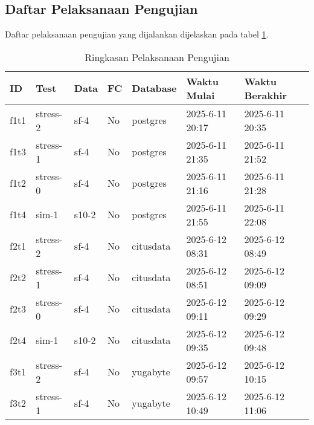 \subsection{Daftar Pelaksanaan Pengujian}

Daftar pelaksanaan pengujian yang dijalankan dijelaskan pada tabel \ref{tab:execution-summary}.

\begin{table}[htbp]
    \centering
    \caption{Ringkasan Pelaksanaan Pengujian}
    \label{tab:execution-summary}
    \begin{tabular}{|l|l|l|l|l|l|l|}
        \hline
        \textbf{ID} & \textbf{Test} & \textbf{Data} & \textbf{FC} & \textbf{Database} & \textbf{Waktu Mulai} & \textbf{Waktu Berakhir} \\ \hline
        f1t1        & stress-2      & sf-4          & No          & postgres          & 2025-6-11 20:17     & 2025-6-11 20:35        \\ \hline
        f1t3        & stress-1      & sf-4          & No          & postgres          & 2025-6-11 21:35     & 2025-6-11 21:52        \\ \hline
        f1t2        & stress-0      & sf-4          & No          & postgres          & 2025-6-11 21:16     & 2025-6-11 21:28        \\ \hline
        f1t4        & sim-1         & s10-2         & No          & postgres          & 2025-6-11 21:55     & 2025-6-11 22:08        \\ \hline
        f2t1        & stress-2      & sf-4          & No          & citusdata         & 2025-6-12 08:31     & 2025-6-12 08:49        \\ \hline
        f2t2        & stress-1      & sf-4          & No          & citusdata         & 2025-6-12 08:51     & 2025-6-12 09:09        \\ \hline
        f2t3        & stress-0      & sf-4          & No          & citusdata         & 2025-6-12 09:11     & 2025-6-12 09:29        \\ \hline
        f2t4        & sim-1         & s10-2         & No          & citusdata         & 2025-6-12 09:35     & 2025-6-12 09:48        \\ \hline
        f3t1        & stress-2      & sf-4          & No          & yugabyte          & 2025-6-12 09:57     & 2025-6-12 10:15        \\ \hline
        f3t2        & stress-1      & sf-4          & No          & yugabyte          & 2025-6-12 10:49     & 2025-6-12 11:06        \\ \hline

\end{tabular}
\end{table}

